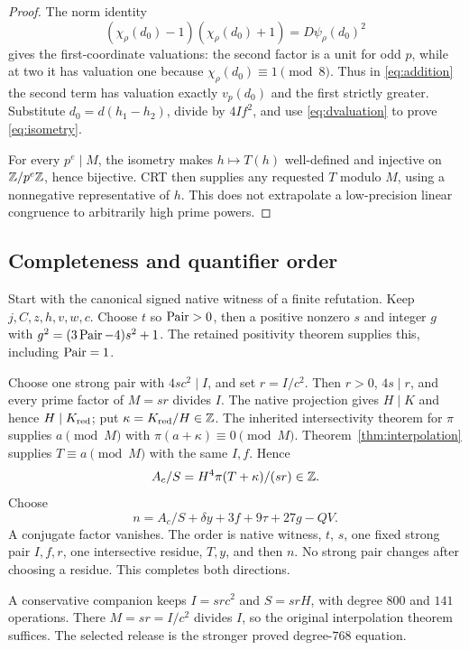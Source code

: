 \begin{proof}
The norm identity
\[
 (\chi_\rho(d_0)-1)(\chi_\rho(d_0)+1)=D\psi_\rho(d_0)^2
\]
gives the first-coordinate valuations: the second factor is a unit for odd $p$, while at two it has valuation one because $\chi_\rho(d_0)\equiv1\pmod8$. Thus in \eqref{eq:addition} the second term has valuation exactly $v_p(d_0)$ and the first strictly greater. Substitute $d_0=d(h_1-h_2)$, divide by $4If^2$, and use \eqref{eq:dvaluation} to prove \eqref{eq:isometry}.

For every $p^e\mid M$, the isometry makes $h\mapsto T(h)$ well-defined and injective on $\mathbb Z/p^e\mathbb Z$, hence bijective. CRT then supplies any requested $T$ modulo $M$, using a nonnegative representative of $h$. This does not extrapolate a low-precision linear congruence to arbitrarily high prime powers.
\end{proof}

\subsection{Completeness and quantifier order}
Start with the canonical signed native witness of a finite refutation. Keep $j,C,z,h,v,w,c$. Choose $t$ so $\operatorname{Pair}>0$, then a positive nonzero $s$ and integer $g$ with $g^2=(3\operatorname{Pair}-4)s^2+1$. The retained positivity theorem supplies this, including $\operatorname{Pair}=1$.

Choose one strong pair with $4sc^2\mid I$, and set $r=I/c^2$. Then $r>0$, $4s\mid r$, and every prime factor of $M=sr$ divides $I$. The native projection gives $H\mid K$ and hence $H\mid K_{\mathrm{red}}$; put $\kappa=K_{\mathrm{red}}/H\in\mathbb Z$. The inherited intersectivity theorem for $\pi$ supplies $a\pmod M$ with $\pi(a+\kappa)\equiv0\pmod M$. Theorem~\ref{thm:interpolation} supplies $T\equiv a\pmod M$ with the same $I,f$. Hence
\[
 A_c/S=H^4\pi(T+\kappa)/(sr)\in\mathbb Z.
\]
Choose
\[
 n=A_c/S+\delta y+3f+9\tau+27g-QV.
\]
A conjugate factor vanishes. The order is native witness, $t$, $s$, one fixed strong pair $I,f,r$, one intersective residue, $T,y$, and then $n$. No strong pair changes after choosing a residue. This completes both directions.

A conservative companion keeps $I=src^2$ and $S=srH$, with degree $800$ and $141$ operations. There $M=sr=I/c^2$ divides $I$, so the original interpolation theorem suffices. The selected release is the stronger proved degree-$768$ equation.

